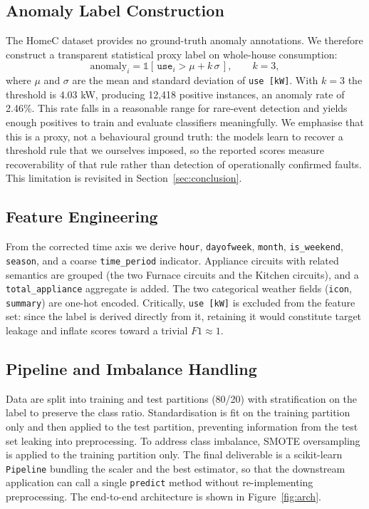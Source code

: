 \documentclass[pdflatex,sn-mathphys-num]{sn-jnl}%
\theoremstyle{thmstyleone}%
\theoremstyle{thmstyletwo}%
\theoremstyle{thmstylethree}%
\begin{document}
\subsection{Anomaly Label Construction}
The HomeC dataset provides no ground-truth anomaly annotations. We therefore construct a transparent statistical proxy label on whole-house consumption:
\begin{equation}
\text{anomaly}_i = \mathbb{1}\!\left[\, \texttt{use}_i > \mu + k\,\sigma \,\right], \qquad k = 3,
\end{equation}
where $\mu$ and $\sigma$ are the mean and standard deviation of \texttt{use [kW]}. With $k=3$ the threshold is $4.03$ kW, producing 12{,}418 positive instances, an anomaly rate of 2.46\%. This rate falls in a reasonable range for rare-event detection and yields enough positives to train and evaluate classifiers meaningfully. We emphasise that this is a proxy, not a behavioural ground truth: the models learn to recover a threshold rule that we ourselves imposed, so the reported scores measure recoverability of that rule rather than detection of operationally confirmed faults. This limitation is revisited in Section~\ref{sec:conclusion}.

\subsection{Feature Engineering}
From the corrected time axis we derive \texttt{hour}, \texttt{dayofweek}, \texttt{month}, \texttt{is\_weekend}, \texttt{season}, and a coarse \texttt{time\_period} indicator. Appliance circuits with related semantics are grouped (the two Furnace circuits and the Kitchen circuits), and a \texttt{total\_appliance} aggregate is added. The two categorical weather fields (\texttt{icon}, \texttt{summary}) are one-hot encoded. Critically, \texttt{use [kW]} is excluded from the feature set: since the label is derived directly from it, retaining it would constitute target leakage and inflate scores toward a trivial $F1 \approx 1$.

\subsection{Pipeline and Imbalance Handling}
Data are split into training and test partitions (80/20) with stratification on the label to preserve the class ratio. Standardisation is fit on the training partition only and then applied to the test partition, preventing information from the test set leaking into preprocessing. To address class imbalance, SMOTE oversampling is applied to the training partition only. The final deliverable is a scikit-learn \texttt{Pipeline} bundling the scaler and the best estimator, so that the downstream application can call a single \texttt{predict} method without re-implementing preprocessing. The end-to-end architecture is shown in Figure~\ref{fig:arch}.
\end{document}

